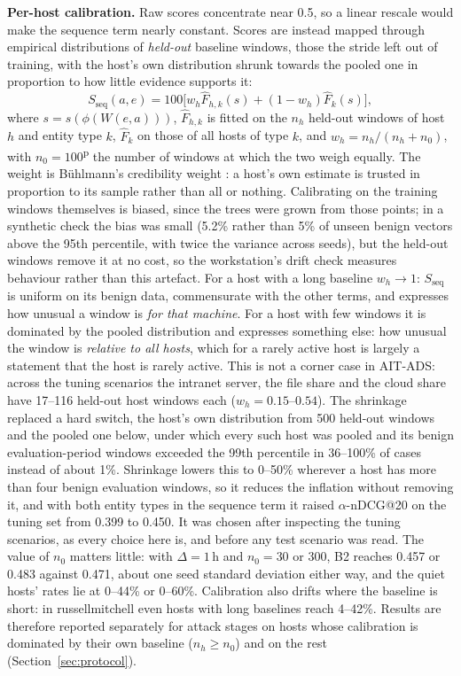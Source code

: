 \documentclass[conference]{IEEEtran}
\newcommand{\prov}{\textsuperscript{\textcolor{orange!80!black}{p}}}   %
\begin{document}
\textbf{Per-host calibration.} Raw scores concentrate near 0.5, so a linear rescale would make the sequence term nearly constant. Scores are instead mapped through empirical distributions of \emph{held-out} baseline windows, those the stride left out of training, with the host's own distribution shrunk towards the pooled one in proportion to how little evidence supports it:
\begin{equation}
S_\mathrm{seq}(a, e) = 100 \big[ w_h \hat F_{h,k}(s) + (1 - w_h) \hat F_{k}(s) \big],
\end{equation}
where $s = s(\phi(W(e,a)))$, $\hat F_{h,k}$ is fitted on the $n_h$ held-out windows of host $h$ and entity type $k$, $\hat F_k$ on those of all hosts of type $k$, and $w_h = n_h/(n_h + n_0)$, with $n_0 = 100$\prov{} the number of windows at which the two weigh equally. The weight is B\"uhlmann's credibility weight \cite{ref25}: a host's own estimate is trusted in proportion to its sample rather than all or nothing. Calibrating on the training windows themselves is biased, since the trees were grown from those points; in a synthetic check the bias was small (5.2\% rather than 5\% of unseen benign vectors above the 95th percentile, with twice the variance across seeds), but the held-out windows remove it at no cost, so the workstation's drift check measures behaviour rather than this artefact. For a host with a long baseline $w_h \to 1$: $S_\mathrm{seq}$ is uniform on its benign data, commensurate with the other terms, and expresses how unusual a window is \emph{for that machine}. For a host with few windows it is dominated by the pooled distribution and expresses something else: how unusual the window is \emph{relative to all hosts}, which for a rarely active host is largely a statement that the host is rarely active. This is not a corner case in AIT-ADS: across the tuning scenarios the intranet server, the file share and the cloud share have 17--116 held-out host windows each ($w_h = 0.15$--$0.54$). The shrinkage replaced a hard switch, the host's own distribution from 500 held-out windows and the pooled one below, under which every such host was pooled and its benign evaluation-period windows exceeded the 99th percentile in 36--100\% of cases instead of about 1\%. Shrinkage lowers this to 0--50\% wherever a host has more than four benign evaluation windows, so it reduces the inflation without removing it, and with both entity types in the sequence term it raised $\alpha$-nDCG@20 on the tuning set from 0.399 to 0.450. It was chosen after inspecting the tuning scenarios, as every choice here is, and before any test scenario was read. The value of $n_0$ matters little: with $\Delta = 1$\,h and $n_0 = 30$ or 300, B2 reaches 0.457 or 0.483 against 0.471, about one seed standard deviation either way, and the quiet hosts' rates lie at 0--44\% or 0--60\%. Calibration also drifts where the baseline is short: in russellmitchell even hosts with long baselines reach 4--42\%. Results are therefore reported separately for attack stages on hosts whose calibration is dominated by their own baseline ($n_h \ge n_0$) and on the rest (Section~\ref{sec:protocol}).
\end{document}
